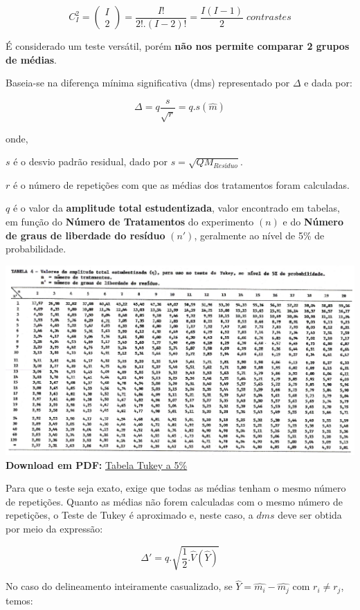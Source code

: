 \documentclass[
]{book}
\begin{document}
\[
C_I^2 = \begin{pmatrix} I \\ 2\end{pmatrix} = \frac{I!}{2!.(I-2)!} = \frac{I(I-1)}{2}\;contrastes
\]

É considerado um teste versátil, porém \textbf{não nos permite comparar 2 grupos de médias}.

Baseia-se na diferença mínima significativa (dms) representado por \(\Delta\) e dada por:

\[
\Delta = q\frac{s}{\sqrt{r}} = q.s(\hat{m})
\]

onde,

\(s\) é o desvio padrão residual, dado por \(s = \sqrt{QM_{Resíduo}}\).

\(r\) é o número de repetições com que as médias dos tratamentos foram calculadas.

\(q\) é o valor da \textbf{amplitude total estudentizada}, valor encontrado em tabelas, em função do \textbf{Número de Tratamentos} do experimento \((n)\) e do \textbf{Número de graus de liberdade do resíduo} \((n')\), geralmente ao nível de 5\% de probabilidade.

\includegraphics{tTukey.png}
\textbf{Download em PDF:} \href{https://github.com/arpanosso/ExpAgr_2020/raw/master/Tabela_Tukey_5p.pdf}{Tabela Tukey a 5\%}

Para que o teste seja exato, exige que todas as médias tenham o mesmo número de repetições. Quanto as médias não forem calculadas com o mesmo número de repetições, o Teste de Tukey é aproximado e, neste caso, a \(dms\) deve ser obtida por meio da expressão:

\[
\Delta' = q.\sqrt{\frac{1}{2}.\hat{V}(\hat{Y})}
\]

No caso do delineamento inteiramente casualizado, se \(\hat{Y} = \hat{m_i} - \hat{m_j}\) com \(r_i \neq r_j\), temos:
\end{document}
